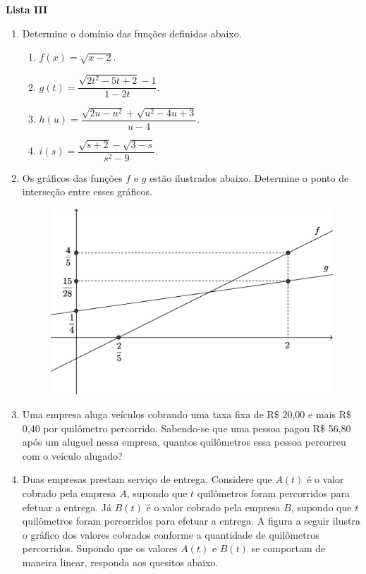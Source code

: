 \documentclass[12pt,a4paper]{article}
\begin{document}
\begin{center}
  \textbf{Lista III}
\end{center}

\begin{enumerate}
  \item Determine o domínio das funções definidas abaixo.
  \begin{enumerate}
    \item $f(x) = \sqrt{x - 2}$.
    \item $g(t) = \dfrac{\sqrt{2t^2 - 5t + 2} - 1}{1 - 2t}$.
    \item $h(u) = \dfrac{\sqrt{2u - u^2} + \sqrt{u^2 - 4u + 3}}{u - 4}$.
    \item $i(s) = \dfrac{\sqrt{s + 2} - \sqrt{3 - s}}{s^2 - 9}$.
  \end{enumerate}
  
  \item Os gráficos das funções $f$ e $g$ estão ilustrados abaixo. Determine o ponto de interseção entre esses gráficos.
  
    \begin{figure}[H]
     \centering
     \includegraphics[scale=0.4]{figura/grafico-intersecao-de-retas.eps}
    \end{figure}
  
  \item Uma empresa aluga veículos cobrando uma taxa fixa de R\$ 20,00 e mais
    R\$ 0,40 por quilômetro percorrido. Sabendo-se que uma pessoa pagou
    R\$ 56,80 após um aluguel nessa empresa, quantos quilômetros essa pessoa
    percorreu com o veículo alugado?

  \item Duas empresas prestam serviço de entrega. Considere que $A(t)$ é o valor
    cobrado pela empresa $A$, supondo que $t$ quilômetros foram percorridos para
    efetuar a entrega. Já $B(t)$ é o valor cobrado pela empresa $B$, supondo que
    $t$ quilômetros foram percorridos para efetuar a entrega. A figura a seguir
    ilustra o gráfico dos valores cobrados conforme a quantidade de quilômetros
    percorridos. Supondo que os valores $A(t)$ e $B(t)$ se comportam de maneira
    linear, responda aos quesitos abaixo.
  

\end{enumerate}
\end{document}

